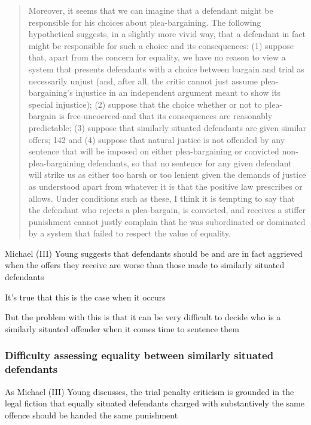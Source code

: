 \begin{quote}
    Moreover, it seems that we can imagine that a defendant might be responsible for his choices about plea-bargaining. The following hypothetical suggests, in a slightly more vivid way, that a defendant in fact might be responsible for such a choice and its consequences: (1) suppose that, apart from the concern for equality, we have no reason to view a system that presents defendants with a choice between bargain and trial as necessarily unjust (and, after all, the critic cannot just assume plea-bargaining's injustice in an independent argument meant to show its special injustice); (2) suppose that the choice whether or not to plea-bargain is free-uncoerced-and that its consequences are reasonably predictable; (3) suppose that similarly situated defendants are given similar offers; 142 and (4) suppose that natural justice is not offended by any sentence that will be imposed on either plea-bargaining or convicted non-plea-bargaining defendants, so that no sentence for any given defendant will strike us as either too harsh or too lenient given the demands of justice as understood apart from whatever it is that the positive law prescribes or allows. Under conditions such as these, I think it is tempting to say that the defendant who rejects a plea-bargain, is convicted, and receives a stiffer punishment cannot justly complain that he was subordinated or dominated by a system that failed to respect the value of equality.
\end{quote}

Michael (III) Young suggests that defendants should be and are in fact aggrieved when the offers they receive are worse than those made to similarly situated defendants

It's true that this is the case when it occurs

But the problem with this is that it can be very difficult to decide who is a similarly situated offender when it comes time to sentence them

\subsubsection{Difficulty assessing equality between similarly situated defendants}

As Michael (III) Young discusses, the trial penalty criticism is grounded in the legal fiction that equally situated defendants charged with substantively the same offence should be handed the same punishment

